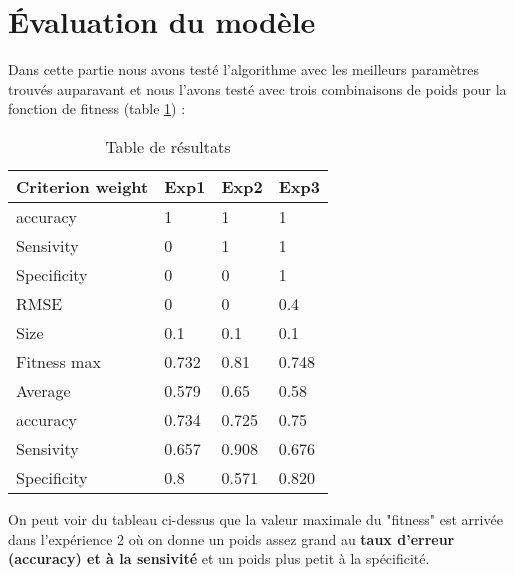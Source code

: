\newpage
\section*{Évaluation du modèle}

Dans cette partie nous avons testé l'algorithme avec les meilleurs paramètres trouvés auparavant et nous l'avons testé avec trois combinaisons de poids pour la fonction de fitness (table \ref{table_param}) :


\begin{table}[h]
  \centering
  \begin{tabular}{|l|l|l|l|}
  \hline
  \textbf{Criterion weight} & \textbf{Exp1} & \textbf{Exp2} & \textbf{Exp3} \\ \hline
  accuracy                 & 1             & 1             & 1             \\ \hline
  Sensivity                & 0             & 1             & 1             \\ \hline
  Specificity              & 0             & 0             & 1             \\ \hline
  RMSE                     & 0             & 0             & 0.4           \\ \hline
  Size                     & 0.1           & 0.1           & 0.1           \\ \hline
  Fitness max              & 0.732         & 0.81          & 0.748         \\ \hline
  Average                  & 0.579         & 0.65          & 0.58          \\ \hline
  accuracy                 & 0.734         & 0.725         & 0.75          \\ \hline
  Sensivity                & 0.657         & 0.908         & 0.676         \\ \hline
  Specificity              & 0.8           & 0.571         & 0.820         \\ \hline
  \end{tabular}
  \caption{\label{table_param} Table de résultats}
\end{table}

On peut voir du tableau ci-dessus que la valeur maximale du "fitness" est arrivée dans l'expérience 2 où on donne un poids assez grand au \textbf{taux d'erreur (accuracy) et à la sensivité} et un poids plus petit à la spécificité.


